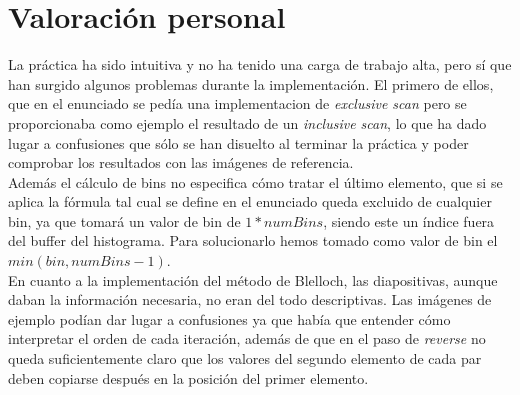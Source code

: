 \documentclass[10pt,oneside,a4paper]{article}
\begin{document}
\section{Valoración personal}
La práctica ha sido intuitiva y no ha tenido una carga de trabajo alta, pero sí que han surgido algunos problemas durante la implementación. El primero de ellos, que en el enunciado se pedía una implementacion de \emph{exclusive scan} pero se proporcionaba como ejemplo el resultado de un \emph{inclusive scan}, lo que ha dado lugar a confusiones que sólo se han disuelto al terminar la práctica y poder comprobar los resultados con las imágenes de referencia.\\

Además el cálculo de bins no especifica cómo tratar el último elemento, que si se aplica la fórmula tal cual se define en el enunciado queda excluido de cualquier bin, ya que tomará un valor de bin de $1 * numBins$, siendo este un índice fuera del buffer del histograma. Para solucionarlo hemos tomado como valor de bin el $min(bin, numBins-1)$.\\

En cuanto a la implementación del método de Blelloch, las diapositivas, aunque daban la información necesaria, no eran del todo descriptivas. Las imágenes de ejemplo podían dar lugar a confusiones ya que había que entender cómo interpretar el orden de cada iteración, además de que en el paso de \emph{reverse} no queda suficientemente claro que los valores del segundo elemento de cada par deben copiarse después en la posición del primer elemento.
\end{document}
